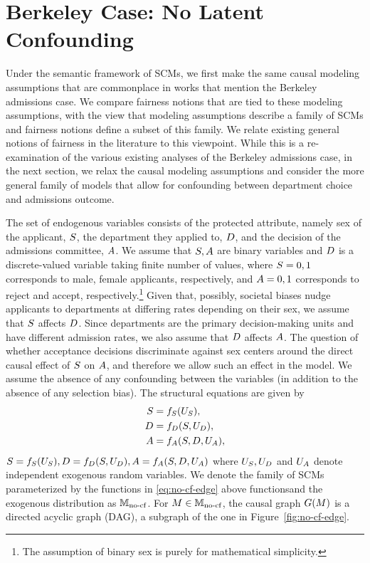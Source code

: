 \section{Berkeley Case: No Latent Confounding}\label{sec:modeling}
 

Under the semantic framework of SCMs, we first make the same causal modeling assumptions that are commonplace in works that mention the Berkeley admissions case. We compare fairness notions that are tied to these modeling assumptions, with the view that modeling assumptions describe a family of SCMs and fairness notions define a subset of this family. We relate existing general notions of fairness in the literature to this viewpoint. While this is a re-examination of the various existing analyses of the Berkeley admissions case, in the next section, we relax the causal modeling assumptions and consider the more general family of models that allow for confounding between department choice and admissions outcome.

The set of endogenous variables consists of the protected attribute, namely sex of the applicant, $S$, the department they applied to, $D$, and the decision of the admissions committee, $A$. We assume that $S, A$ are binary variables and $D$ is a discrete-valued variable taking finite number of values, where $S=0,1$ corresponds to male, female applicants, respectively, and $A=0,1$ corresponds to reject and accept, respectively.\footnote{The assumption of binary sex is purely for mathematical simplicity.} Given that, possibly, societal biases nudge applicants to departments at differing rates depending on their sex, we assume that $S$ affects $D$. Since departments are the primary decision-making units and have different admission rates, we also assume that $D$ affects $A$. The question of whether acceptance decisions discriminate against sex centers around the direct causal effect of $S$ on $A$, and therefore we allow such an effect in the model. We assume the absence of any confounding between the variables (in addition to the absence of any selection bias). The structural equations are given by
\ifdefined\SINGLE
\begin{align}\label{eq:no-cf-edge}
    S &= f_{S}(U_{S}) \nonumber, \\
    D &= f_{D}(S, U_{D}), \\
    A &= f_{A}(S,D,U_{A}), \nonumber
\end{align}
\else $S = f_{S}(U_{S}), 
    D = f_{D}(S, U_{D}),
    A = f_{A}(S,D,U_{A})$
\fi 
where $U_{S},U_{D}$ and $U_{A}$ denote independent exogenous random variables. We denote the family of SCMs parameterized by the \ifdefined\SINGLE functions in \eqref{eq:no-cf-edge} \else above functions\fi and the exogenous distribution as $\mathbb{M}_{\text{no-cf}}$. 
For $M \in \mathbb{M}_{\text{no-cf}}$, the causal graph $G(M)$ is a directed acyclic graph (DAG), a subgraph of the one in Figure~\ref{fig:no-cf-edge}. 

